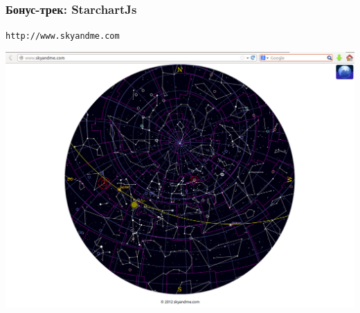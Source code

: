 \begin{frame}
  \frametitle{Бонус-трек: StarchartJs}
\texttt{http://www.skyandme.com}

\includegraphics[width=1.0\textwidth]{skyandme-ss.png}

\end{frame}
